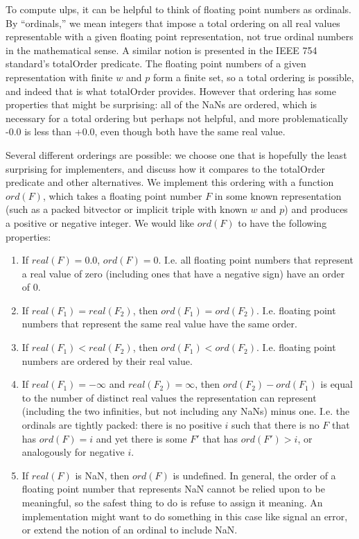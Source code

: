 \documentclass[letterpaper,10pt]{article}
\begin{document}
To compute ulps, it can be helpful to think of floating point numbers as ordinals. By ``ordinals,'' we mean integers that impose a total ordering on all real values representable with a given floating point representation, not true ordinal numbers in the mathematical sense. A similar notion is presented in the IEEE 754 standard's totalOrder predicate. The floating point numbers of a given representation with finite $w$ and $p$ form a finite set, so a total ordering is possible, and indeed that is what totalOrder provides. However that ordering has some properties that might be surprising: all of the NaNs are ordered, which is necessary for a total ordering but perhaps not helpful, and more problematically -0.0 is less than +0.0, even though both have the same real value.

Several different orderings are possible: we choose one that is hopefully the least surprising for implementers, and discuss how it compares to the totalOrder predicate and other alternatives. We implement this ordering with a function $ord(F)$, which takes a floating point number $F$ in some known representation (such as a packed bitvector or implicit triple with known $w$ and $p$) and produces a positive or negative integer. We would like $ord(F)$ to have the following properties:

\begin{enumerate}
 \item If $real(F) = 0.0$, $ord(F) = 0$. I.e. all floating point numbers that represent a real value of zero (including ones that have a negative sign) have an order of 0.
 \item If $real(F_1) = real(F_2)$, then $ord(F_1) = ord(F_2)$. I.e. floating point numbers that represent the same real value have the same order.
 \item If $real(F_1) < real(F_2)$, then $ord(F_1) < ord(F_2)$. I.e. floating point numbers are ordered by their real value.
 \item If $real(F_1) = -\infty$ and $real(F_2) = \infty$, then $ord(F_2) - ord(F_1)$ is equal to the number of distinct real values the representation can represent (including the two infinities, but not including any NaNs) minus one. I.e. the ordinals are tightly packed: there is no positive $i$ such that there is no $F$ that has $ord(F) = i$ and yet there is some $F'$ that has $ord(F') > i$, or analogously for negative $i$.
 \item If $real(F)$ is NaN, then $ord(F)$ is undefined. In general, the order of a floating point number that represents NaN cannot be relied upon to be meaningful, so the safest thing to do is refuse to assign it meaning. An implementation might want to do something in this case like signal an error, or extend the notion of an ordinal to include NaN.
\end{enumerate}
\end{document}
